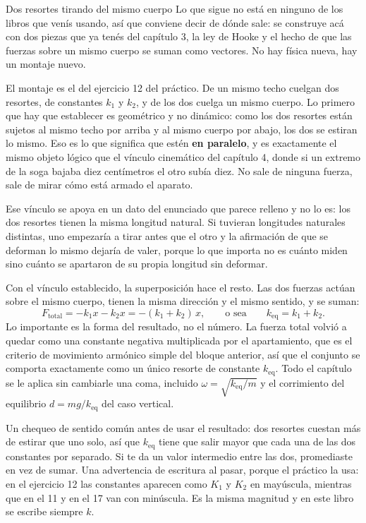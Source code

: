 \documentclass[11pt,openany]{book}
\begin{document}
\begin{bloque}{Dos resortes tirando del mismo cuerpo}
Lo que sigue no está en ninguno de los libros que venís usando, así que conviene decir de dónde sale: se construye acá con dos piezas que ya tenés del capítulo 3, la ley de Hooke y el hecho de que las fuerzas sobre un mismo cuerpo se suman como vectores. No hay física nueva, hay un montaje nuevo.

El montaje es el del ejercicio 12 del práctico. De un mismo techo cuelgan dos resortes, de constantes $k_1$ y $k_2$, y de los dos cuelga un mismo cuerpo. Lo primero que hay que establecer es geométrico y no dinámico: como los dos resortes están sujetos al mismo techo por arriba y al mismo cuerpo por abajo, los dos se estiran lo mismo. Eso es lo que significa que estén \textbf{en paralelo}, y es exactamente el mismo objeto lógico que el vínculo cinemático del capítulo 4, donde si un extremo de la soga bajaba diez centímetros el otro subía diez. No sale de ninguna fuerza, sale de mirar cómo está armado el aparato.

Ese vínculo se apoya en un dato del enunciado que parece relleno y no lo es: los dos resortes tienen la misma longitud natural. Si tuvieran longitudes naturales distintas, uno empezaría a tirar antes que el otro y la afirmación de que se deforman lo mismo dejaría de valer, porque lo que importa no es cuánto miden sino cuánto se apartaron de su propia longitud sin deformar.

Con el vínculo establecido, la superposición hace el resto. Las dos fuerzas actúan sobre el mismo cuerpo, tienen la misma dirección y el mismo sentido, y se suman:
\[
F_{\text{total}} = -k_1 x - k_2 x = -(k_1 + k_2)\,x ,
\qquad\text{o sea}\qquad
k_{\text{eq}} = k_1 + k_2 .
\]
Lo importante es la forma del resultado, no el número. La fuerza total volvió a quedar como una constante negativa multiplicada por el apartamiento, que es el criterio de movimiento armónico simple del bloque anterior, así que el conjunto se comporta exactamente como un único resorte de constante $k_{\text{eq}}$. Todo el capítulo se le aplica sin cambiarle una coma, incluido $\omega = \sqrt{k_{\text{eq}}/m}$ y el corrimiento del equilibrio $d = mg/k_{\text{eq}}$ del caso vertical.

Un chequeo de sentido común antes de usar el resultado: dos resortes cuestan más de estirar que uno solo, así que $k_{\text{eq}}$ tiene que salir mayor que cada una de las dos constantes por separado. Si te da un valor intermedio entre las dos, promediaste en vez de sumar. Una advertencia de escritura al pasar, porque el práctico la usa: en el ejercicio 12 las constantes aparecen como $K_1$ y $K_2$ en mayúscula, mientras que en el 11 y en el 17 van con minúscula. Es la misma magnitud y en este libro se escribe siempre $k$.


\end{bloque}
\end{document}
